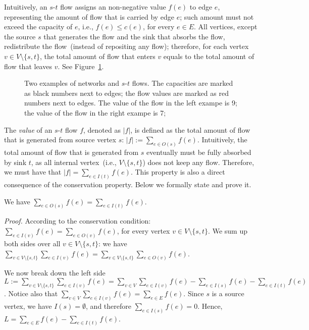 Intuitively, an $s$-$t$ flow assigns an non-negative value $f(e)$ to edge $e$, representing the
amount of flow that is carried by edge $e$; such amount must not exceed the capacity of $e$, i.e., $f(e) \le c(e)$, for every $e\in E$.
All vertices, except the source $s$ that generates the flow and the sink that absorbs the flow,
redistribute the flow~(instead of repositing any flow); therefore, for each vertex $v\in V\setminus\{s,t\}$,
the total amount of flow that enters $v$ equals to the total amount of flow that leaves $v$.
See Figure~\ref{fig:flow}.

\begin{figure}[h]
\centering{}
\caption{Two examples of networks and $s$-$t$ flows.
The capacities are marked as black numbers next to edges;
the flow values are marked as red numbers next to edges.
The value of the flow in the left exampe is 9;
the value of the flow in the right exampe is 7;}
\label{fig:flow}
\end{figure}

The \emph{value} of an $s$-$t$ flow $f$, denoted as $|f|$,
is defined as the total amount of flow that is generated from source vertex $s$:
$|f| := \sum_{e\in O(s)} f(e)$. Intuitively, the total amount of flow that is generated
from $s$ eventually must be fully absorbed by sink $t$, as all internal vertex~(i.e., $V\setminus\{s,t\}$)
does not keep any flow. Therefore, we must have that 
$|f| = \sum_{e\in I(t)} f(e)$.  
This property is also a direct consequence of the conservation property.
Below we formally state and prove it.

\begin{fact}
We have $\sum_{e\in O(s)} f(e) = \sum_{e\in I(t)} f(e)$. 
\end{fact}

\emph{Proof.} According to the conservation condition:
$\sum_{e\in I(v)} f(e) = \sum_{e\in O(v)} f(e)$, 
for every vertex $v\in V\setminus\{s,t\}$. 
We sum up both sides over all $v\in V\setminus\{s,t\}$: 
we have $\sum_{v\in V\setminus\{s,t\}} \sum_{e\in I(v)} f(e) = \sum_{v\in V\setminus\{s,t\}} \sum_{e\in O(v)} f(e)$. 

We now break down the left side 
$L := \sum_{v\in V\setminus\{s,t\}} \sum_{e\in I(v)} f(e) 
= \sum_{v\in V} \sum_{e\in I(v)} f(e) -  \sum_{e\in I(s)} f(e) - \sum_{e\in I(t)} f(e)$.
Notice also that $\sum_{v\in V} \sum_{e\in I(v)} f(e) = \sum_{e\in E} f(e)$.
Since $s$ is a source vertex, we have $I(s) = \emptyset$, and therefore $\sum_{e\in I(s)} f(e)  = 0$.
Hence, $L = \sum_{e\in E} f(e) - \sum_{e\in I(t)} f(e)$.

